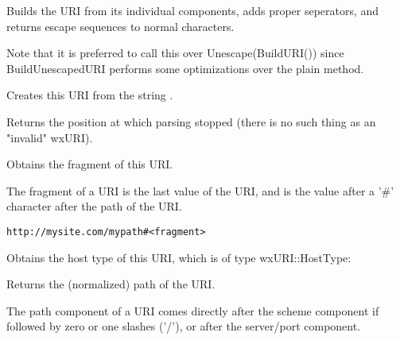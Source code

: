 Builds the URI from its individual components, adds proper seperators, and
returns escape sequences to normal characters.

Note that it is preferred to call this over Unescape(BuildURI()) since
BuildUnescapedURI performs some optimizations over the plain method.


\label{wxuricreate}


Creates this URI from the string .

Returns the position at which parsing stopped (there 
is no such thing as an "invalid" wxURI).



\label{wxurigetfragment}


Obtains the fragment of this URI.

The fragment of a URI is the last value of the URI,
and is the value after a '#' character after the path 
of the URI.

\tt{http://mysite.com/mypath\#<fragment>}

\label{wxurigethosttype}


Obtains the host type of this URI, which is of type
wxURI::HostType:

\twocolwidtha{7cm}
\begin{twocollist}\itemsep=0pt
\end{twocollist}

\label{wxurigetpath}


Returns the (normalized) path of the URI.

The path component of a URI comes
directly after the scheme component
if followed by zero or one slashes ('/'),
or after the server/port component.

